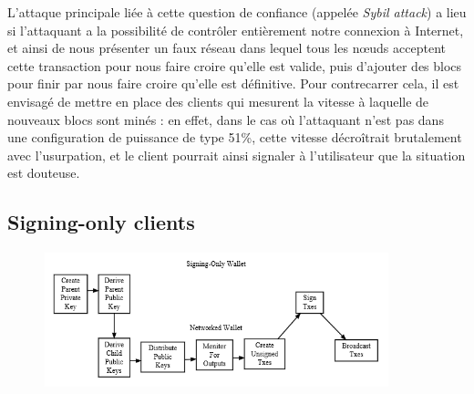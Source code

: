 \documentclass[11pt,a4paper]{article}
\begin{document}
L'attaque principale liée à cette question de confiance (appelée \textit{Sybil attack}) a lieu si l'attaquant a la possibilité de contrôler entièrement notre connexion à Internet, et ainsi de nous présenter un faux réseau dans lequel tous les n\oe{}uds acceptent cette transaction pour nous faire croire qu'elle est valide, puis d'ajouter des blocs pour finir par nous faire croire qu'elle est définitive. Pour contrecarrer cela, il est envisagé de mettre en place des clients qui mesurent la vitesse à laquelle de nouveaux blocs sont minés : en effet, dans le cas où l'attaquant n'est pas dans une configuration de puissance de type 51\%, cette vitesse décroîtrait brutalement avec l'usurpation, et le client pourrait ainsi signaler à l'utilisateur que la situation est douteuse.
\subsection{Signing-only clients}
\begin{figure}[h]
	\centering
	\includegraphics[width=10cm]{en-wallets-signing-only}
\end{figure}
\end{document}

